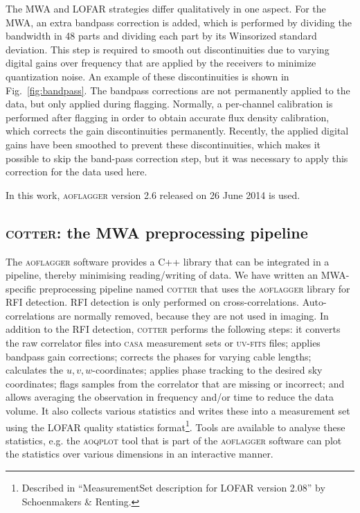 \documentclass{pasa}
\begin{document}
The MWA and LOFAR strategies differ qualitatively in one aspect. For the MWA, an extra bandpass correction is added, which is performed by dividing the bandwidth in 48 parts and dividing each part by its Winsorized standard deviation. This step is required to smooth out discontinuities due to varying digital gains over frequency that are applied by the receivers to minimize quantization noise. An example of these discontinuities is shown in Fig.~\ref{fig:bandpass}. The bandpass corrections are not permanently applied to the data, but only applied during flagging. Normally, a per-channel calibration is performed after flagging in order to obtain accurate flux density calibration, which corrects the gain discontinuities permanently. Recently, the applied digital gains have been smoothed to prevent these discontinuities, which makes it possible to skip the band-pass correction step, but it was necessary to apply this correction for the data used here.

In this work, \textsc{aoflagger} version 2.6 released on 26 June 2014 is used.

\subsection{\textsc{cotter}: the MWA preprocessing pipeline}

The \textsc{aoflagger} software provides a C++ library %
that can be integrated in a pipeline, thereby minimising reading/writing of data. We have written an MWA-specific preprocessing pipeline named \textsc{cotter} that uses the \textsc{aoflagger} library for RFI detection. RFI detection is only performed on cross-correlations. Auto-correlations are normally removed, because they are not used in imaging. In addition to the RFI detection, \textsc{cotter} performs the following steps: it converts the raw correlator files into \textsc{casa} measurement sets or \textsc{uv-fits} files; applies bandpass gain corrections; corrects the phases for varying cable lengths; calculates the $u,v,w$-coordinates; applies phase tracking to the desired sky coordinates; flags samples from the correlator that are missing or incorrect; and allows averaging the observation in frequency and/or time to reduce the data volume. It also collects various statistics and writes these into a measurement set using the LOFAR quality statistics format\footnote{Described in ``MeasurementSet description for LOFAR version 2.08'' by Schoenmakers \& Renting.}. Tools are available to analyse these statistics, e.g. the \textsc{aoqplot} tool that is part of the \textsc{aoflagger} software can plot the statistics over various dimensions in an interactive manner.
\end{document}
